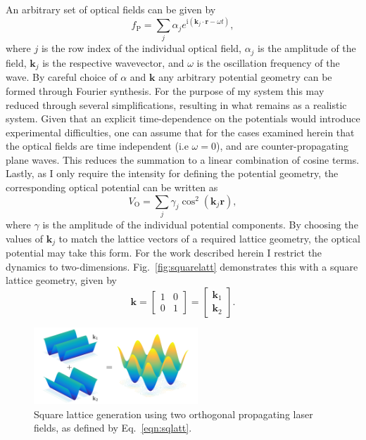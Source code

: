 An arbitrary set of optical fields can be given by
\begin{equation}\label{eqn:optfield}
    f_{\textrm{P}} = \displaystyle\sum\limits_{j} \alpha_j e^{\textrm{i}\left(\mathbf{k}_j\cdot\mathbf{r} - \omega t\right)},
\end{equation}
where $j$ is the row index of the individual optical field, $\alpha_j$ is the amplitude of the field, $\mathbf{k}_j$ is the respective wavevector, and $\omega$ is the oscillation frequency of the wave. By careful choice of $\alpha$ and $\mathbf{k}$ any arbitrary potential geometry can be formed through Fourier synthesis. For the purpose of my system this may reduced through several simplifications, resulting in what remains as a realistic system. Given that an explicit time-dependence on the potentials would introduce experimental difficulties, one can assume that for the cases examined herein that the optical fields are time independent (i.e $\omega=0$), and are counter-propagating plane waves. This reduces the summation to a linear combination of cosine terms. Lastly, as I only require the intensity for defining the potential geometry, the corresponding optical potential can be written as
\begin{equation}\label{eqn:vopt}
    V_{\textrm{O}} = \displaystyle\sum\limits_{j} \gamma_j \cos^2 \left(\mathbf{k}_j \mathbf{r}\right),
\end{equation}
where $\gamma$ is the amplitude of the individual potential components. By choosing the values of $\mathbf{k}_j$ to match the lattice vectors of a required lattice geometry, the optical potential may take this form. For the work described herein I restrict the dynamics to two-dimensions. Fig.~\ref{fig:squarelatt} demonstrates this with a square lattice geometry, given by
\begin{equation}\label{eqn:sqlatt}
    \mathbf{k} =
    \begin{bmatrix}
     1 & 0 \\
     0 & 1
    \end{bmatrix} =
    \begin{bmatrix}
     \mathbf{k}_1  \\
     \mathbf{k}_2
    \end{bmatrix}.
\end{equation}

\begin{figure}\centering
    \includegraphics[width=0.55\textwidth]{./Images/ch4_vtx/VOPT/squarelatt}
    \caption{Square lattice generation using two orthogonal propagating laser fields, as defined by Eq.~\ref{eqn:sqlatt}.}\label{fig:cos2xy}
\end{figure}

